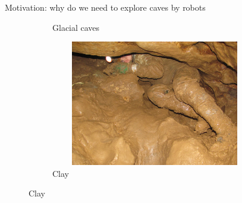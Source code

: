 \documentclass[aspectratio=169]{beamer}
\begin{document}
\begin{frame}[t]{Motivation: why do we need to explore caves by robots}
\begin{figure}[H]
\begin{subfigure}{0.24\textwidth}
            \caption*{Glacial caves}
        \end{subfigure}
        \hfill
        \begin{subfigure}{0.24\textwidth}
            \centering\includegraphics[height=5.5cm,width=1\textwidth,keepaspectratio]{clay.jpg}
            \caption*{Clay}
        \end{subfigure}
        \hfill
    \end{figure}
\end{frame}
\end{document}

